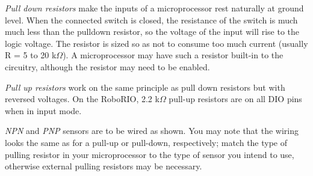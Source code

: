 \begin{asparaenum}[a)]
\item \textit{Pull down resistors} make the inputs of a microprocessor rest naturally at ground level. When the connected switch is closed, the resistance of the switch is much much less than the pulldown resistor, so the voltage of the input will rise to the logic voltage. The resistor is sized so as not to consume too much current (usually R = 5 to 20 k$\Omega$). A microprocessor may have such a resistor built-in to the circuitry, although the resistor may need to be enabled.
\item \textit{Pull up resistors} work on the same principle as pull down resistors but with reversed voltages. On the RoboRIO, 2.2 k$\Omega$ pull-up resistors are on all DIO pins when in input mode.
\item \textit{NPN} and \textit{PNP} sensors are to be wired as shown. You may note that the wiring looks the same as for a pull-up or pull-down, respectively; match the type of pulling resistor in your microprocessor to the type of sensor you intend to use, otherwise external pulling resistors may be necessary.
\end{asparaenum}





